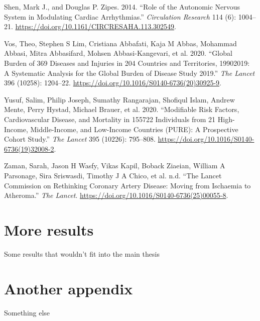 \documentclass[
  a4paper,
  headsepline=true,
  open=any]{scrbook}
\newlength{\cslhangindent}
\newlength{\cslentryspacingunit} %
\newenvironment{CSLReferences}[2] %
 {%
  \setlength{\parindent}{0pt}
  \ifodd #1
  \let\oldpar\par
  \def\par{\hangindent=\cslhangindent\oldpar}
  \fi
  \setlength{\parskip}{#2\cslentryspacingunit}
 }%
 {}
\begin{document}
\begin{CSLReferences}{1}{0}
\leavevmode{}%
Shen, Mark J., and Douglas P. Zipes. 2014. {``Role of the Autonomic
Nervous System in Modulating Cardiac Arrhythmias.''} \emph{Circulation
Research} 114 (6): 1004--21.
\url{https://doi.org/10.1161/CIRCRESAHA.113.302549}.

\leavevmode{}%
Vos, Theo, Stephen S Lim, Cristiana Abbafati, Kaja M Abbas, Mohammad
Abbasi, Mitra Abbasifard, Mohsen Abbasi-Kangevari, et al. 2020.
{``Global Burden of 369 Diseases and Injuries in 204 Countries and
Territories, 1990{\textendash}2019: A Systematic Analysis for the Global
Burden of Disease Study 2019.''} \emph{The Lancet} 396 (10258):
1204--22. \url{https://doi.org/10.1016/S0140-6736(20)30925-9}.

\leavevmode{}%
Yusuf, Salim, Philip Joseph, Sumathy Rangarajan, Shofiqul Islam, Andrew
Mente, Perry Hystad, Michael Brauer, et al. 2020. {``Modifiable Risk
Factors, Cardiovascular Disease, and Mortality in 155{\hphantom{,}}722
Individuals from 21 High-Income, Middle-Income, and Low-Income Countries
(PURE): A Prospective Cohort Study.''} \emph{The Lancet} 395 (10226):
795--808. \url{https://doi.org/10.1016/S0140-6736(19)32008-2}.

\leavevmode{}%
Zaman, Sarah, Jason H Wasfy, Vikas Kapil, Boback Ziaeian, William A
Parsonage, Sira Sriswasdi, Timothy J A Chico, et al. n.d. {``The Lancet
Commission on Rethinking Coronary Artery Disease: Moving from Ischaemia
to Atheroma.''} \emph{The Lancet}.
\url{https://doi.org/10.1016/S0140-6736(25)00055-8}.

\end{CSLReferences}

\cleardoublepage
{}
{}
\appendix

\hypertarget{sec-more-results}{%
\chapter{More results}\label{sec-more-results}}

Some results that wouldn't fit into the main thesis

\hypertarget{another-appendix}{%
\chapter{Another appendix}\label{another-appendix}}

Something else


\backmatter
\end{document}
